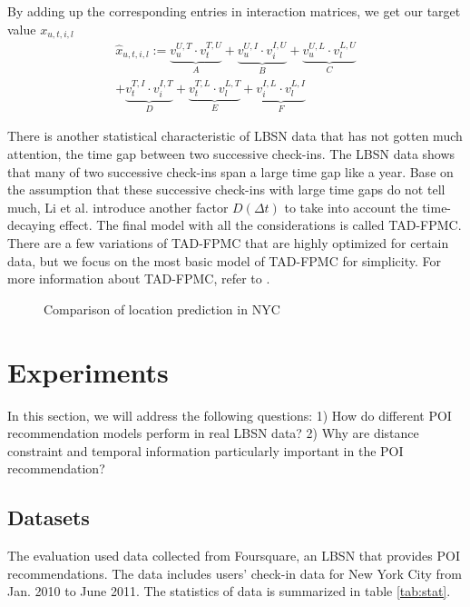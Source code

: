 \documentclass{sig-alternate}
\begin{document}
By adding up the corresponding entries in interaction matrices, we get our target value $x_{u,t,i,l}$
\begin{equation}
\begin{split}
\hat{x}_{u,t,i,l} := \underbrace{v_u^{U,T} \cdot v_t^{T,U}}_{A} + \underbrace{v_u^{U,I} \cdot v_i^{I,U}}_{B} + 
								\underbrace{v_u^{U,L} \cdot v_l^{L,U}}_{C}  \\
	                        + \underbrace{v_t^{T,I} \cdot v_i^{I,T}}_{D} + \underbrace{v_t^{T,L} \cdot v_l^{L,T}}_{E} + 
	                        \underbrace{v_i^{I,L} \cdot v_l^{L,I}}_{F}
\end{split}
\label{eq:TAD-FPMC}
\end{equation}

There is another statistical characteristic of LBSN data that has not gotten much attention, the time gap between 
two successive check-ins. The LBSN data shows that many of two successive check-ins span a large time gap 
like a year. Base on the assumption that these successive check-ins with large time gaps do not tell much, 
Li et al. \cite{Li:2017} introduce another factor $D(\Delta t)$ to take into account the time-decaying effect. 
The final model with all the considerations is called TAD-FPMC. There are a few variations of TAD-FPMC that 
are highly optimized for certain data, but we focus on the most basic model of TAD-FPMC for simplicity. 
For more information about TAD-FPMC, refer to \cite{Li:2017}.

\begin{figure}
\centering
{}
\caption{Comparison of location prediction in NYC \cite{Li:2017}}
\label{fig:ex_NYC}
\end{figure}

\section{Experiments}
\label{sec:experiments}
In this section, we will address the following questions: 1) How do different POI recommendation 
models perform in real LBSN data? 2) Why are distance constraint and temporal information particularly important 
in the POI recommendation?

\subsection{Datasets}
\label{sec:datasets}
The evaluation used data collected from Foursquare, an LBSN that provides POI recommendations. 
The data includes users' check-in data for New York City from Jan. 
2010 to June 2011. The statistics of data is summarized in table \ref{tab:stat}. \cite{Li:2017}
\end{document}
